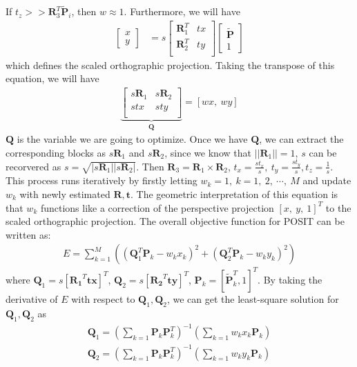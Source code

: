 \documentclass[a4paper]{article}
\begin{document}
If $t_z >> \mathbf{R}_3^T\tilde{\mathbf{P}}_i$, then $w \approx 1$. Furthermore, we will have 
\begin{align*}
\left[
\begin{matrix}
x \\ y 
\end{matrix}\right]&=s
\left[
\begin{matrix}
\mathbf{R}_1^T & tx \\ 
\mathbf{R}_2^T & ty \\ 
\end{matrix}
\right]
\left[
\begin{matrix}
\tilde{\mathbf{P}} \\ 1
\end{matrix}
\right]
\end{align*}
which defines the scaled orthographic projection. Taking the transpose of this equation, we will have
\begin{align*}
[X,\ Y,\ Z,\ 1]
\underbrace{\left[
\begin{matrix}
s\mathbf{R}_1 & s\mathbf{R}_2 \\ 
stx & sty \\ 
\end{matrix}
\right]}_{\mathbf{Q}}=[wx,\ wy]
\end{align*}
$\mathbf{Q}$ is the variable we are going to optimize. Once we have $\mathbf{Q}$, we can extract the corresponding blocks as $s\mathbf{R}_1$ and $s\mathbf{R}_2$, since we know that $||\mathbf{R}_1||=1$, $s$ can be recorvered as $s=\sqrt{|s\mathbf{R}_1||s\mathbf{R}_2|}$. Then $\mathbf{R}_3=\mathbf{R}_1 \times \mathbf{R}_2$, $t_x = \frac{st_x}{s},\ t_y=\frac{st_y}{s}, t_z=\frac{1}{s}$. This process runs iteratively by firstly letting $w_k=1,\ k=1,\ 2,\ \cdots,\ M$ and update $w_k$ with newly estimated $\mathbf{R}, \mathbf{t}$. The geometric interpretation of this equation is that $w_k$ functions like a correction of the perspective projection $[x,\ y,\ 1]^T$ to the scaled orthographic projection. The overall objective function for POSIT can be written as:
\begin{align*}
E=\sum_{k=1}^{M}\left(
\left(
\mathbf{Q}_1^T \mathbf{P}_k - w_kx_k
\right)^2+
\left(
\mathbf{Q}_2^T \mathbf{P}_k - w_ky_k
\right)^2
\right)
\end{align*}
where $\mathbf{Q}_1=s[\mathbf{R_1}^T \mathbf{tx}]^T$, $\mathbf{Q}_2=s[\mathbf{R_2}^T \mathbf{ty}]^T$, $\mathbf{P}_k=[\tilde{\mathbf{P}}_k^T, 1]^T$. By taking the derivative of $E$ with respect to $\mathbf{Q}_1, \mathbf{Q}_2$, we can get the least-square solution for $\mathbf{Q}_1, \mathbf{Q}_2$ as
\begin{align*}
\mathbf{Q}_1=\left(
\sum_{k=1}\mathbf{P}_k\mathbf{P}_k^T
\right)^{-1}\left(
\sum_{k=1} w_kx_k\mathbf{P}_k
\right) \\
\mathbf{Q}_2=\left(
\sum_{k=1}\mathbf{P}_k\mathbf{P}_k^T
\right)^{-1}\left(
\sum_{k=1} w_ky_k\mathbf{P}_k
\right)
\end{align*}
\end{document}
